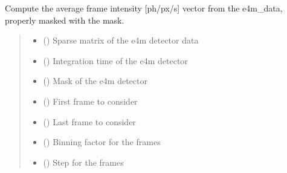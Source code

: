 \documentclass[letterpaper,10pt,english]{sphinxmanual}
\begin{document}
\begin{fulllineitems}
\label{\detokenize{index:XPCS_tools.get_It}}
\pysigstartsignatures
\pysiglinewithargsret
{}
{\sphinxparamcomma {}\sphinxparamcomma {}\sphinxparamcomma {}\sphinxparamcomma {}\sphinxparamcomma {}\sphinxparamcomma {}}
{}
\pysigstopsignatures
\sphinxAtStartPar
Compute the average frame intensity {[}ph/px/s{]} vector from the e4m\_data, properly masked with the mask.
\begin{quote}\begin{description}
\begin{itemize}
\item {} 
\sphinxAtStartPar
{} () \textendash{} Sparse matrix of the e4m detector data

\item {} 
\sphinxAtStartPar
{} () \textendash{} Integration time of the e4m detector

\item {} 
\sphinxAtStartPar
{} () \textendash{} Mask of the e4m detector

\item {} 
\sphinxAtStartPar
{} () \textendash{} First frame to consider

\item {} 
\sphinxAtStartPar
{} () \textendash{} Last frame to consider

\item {} 
\sphinxAtStartPar
{} () \textendash{} Binning factor for the frames

\item {} 
\sphinxAtStartPar
{} () \textendash{} Step for the frames

\end{itemize}


\end{description}
\end{quote}
\end{fulllineitems}
\end{document}
